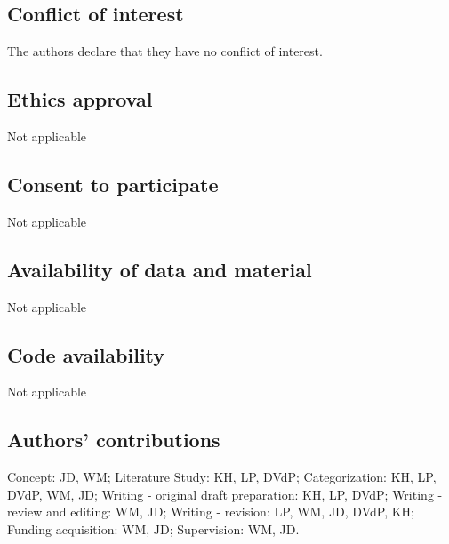 \documentclass[natbib,smallcondensed]{svjour3}
\begin{document}
\subsection*{Conflict of interest}
The authors declare that they have no conflict of interest.

\subsection*{Ethics approval}
Not applicable

\subsection*{Consent to participate}
Not applicable

\subsection*{Availability of data and material}
Not applicable

\subsection*{Code availability}
Not applicable

\subsection*{Authors' contributions}
Concept: JD, WM;
Literature Study: KH, LP, DVdP; 
Categorization: KH, LP, DVdP, WM, JD;
Writing - original draft preparation: KH, LP, DVdP;
Writing - review and editing: WM, JD;
Writing - revision: LP, WM, JD, DVdP, KH;
Funding acquisition: WM, JD;
Supervision: WM, JD.



% 
%



%
\end{document}
